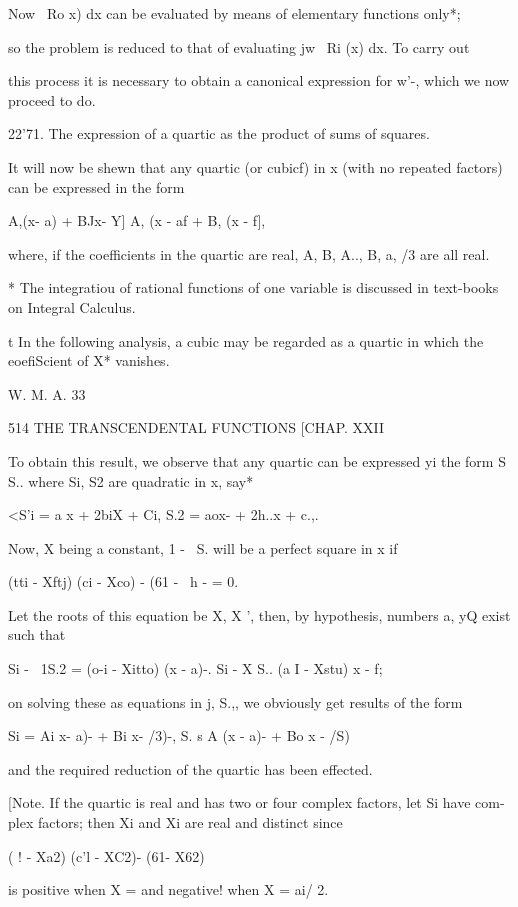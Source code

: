 Now \ Ro x) dx can be evaluated by means of elementary functions
only*;

so the problem is reduced to that of evaluating jw~ Ri (x) dx. To
carry out

this process it is necessary to obtain a canonical expression for w'-,
which we now proceed to do.

22'71. The expression of a quartic as the product of sums of squares.

It will now be shewn that any quartic (or cubicf) in x (with no
repeated factors) can be expressed in the form

 A,(x- a) + BJx- Y] A, (x - af + B, (x - f],

where, if the coefficients in the quartic are real, A, B, A.., B,
a, /3 are all real.

* The integratiou of rational functions of one variable is discussed
in text-books on Integral Calculus.

t In the following analysis, a cubic may be regarded as a quartic in
which the eoefiScient of X* vanishes.

W. M. A. 33

514 THE TRANSCENDENTAL FUNCTIONS [CHAP. XXII

To obtain this result, we observe that any quartic can be expressed yi
the form S S.. where Si, S2 are quadratic in x, say*

<S'i = a x + 2biX + Ci, S.2 = aox- + 2h..x + c.,.

Now, X being a constant, 1 - \ S. will be a perfect square in x if

(tti - Xftj) (ci - Xco) - (61 - \ h - = 0.

Let the roots of this equation be X, X ', then, by hypothesis,
numbers a, yQ exist such that

Si - \ 1S.2 = (o-i - Xitto) (x - a)-. Si - X S.. (a I - Xstu) x - f;

on solving these as equations in j, S.,, we obviously get results of
the form

Si = Ai x- a)- + Bi x- /3)-, S. s A (x - a)- + Bo x - /S)

and the required reduction of the quartic has been effected.

[Note. If the quartic is real and has two or four complex factors, let
Si have com- plex factors; then Xi and Xi are real and distinct since

( ! - Xa2) (c'l - XC2)- (61- X62)

is positive when X = and negative! when X = ai/ 2.


